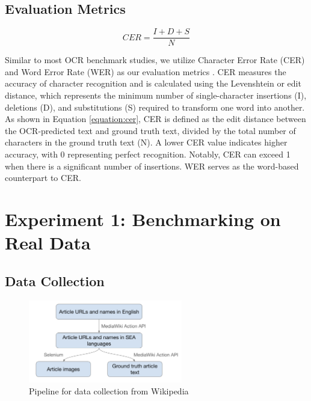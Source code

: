 \documentclass[12pt,oneside]{memoir}
\begin{document}

\subsection{Evaluation Metrics}

\begin{equation}
    CER = \frac{I + D + S}{N}
    \label{equation:cer}
\end{equation}

Similar to most OCR benchmark studies, we utilize Character Error Rate (CER) and 
Word Error Rate (WER) as our evaluation metrics \parencite{hegghammer-2022, ignat-etal-2022}. 
CER measures the accuracy of character recognition and is calculated using the Levenshtein or edit distance, which represents the minimum number of single-character insertions (I), deletions (D), 
and substitutions (S) required to transform one word into another. 
As shown in Equation \ref{equation:cer}, CER is defined as the edit distance between the OCR-predicted text and ground truth text, divided by the total number of characters in the ground truth text (N). 
A lower CER value indicates higher accuracy, with 0 representing perfect recognition. Notably, CER can exceed 1 when there is a significant number of insertions. WER serves as the word-based counterpart to CER.

\section{Experiment 1: Benchmarking on Real Data}

\subsection{Data Collection}

\begin{figure}[ht]
    \centering
    \includegraphics[width=0.6\textwidth]{images/data-collection.png}
    \caption{Pipeline for data collection from Wikipedia}
    \label{figure:data-collection}
\end{figure}
\end{document}

